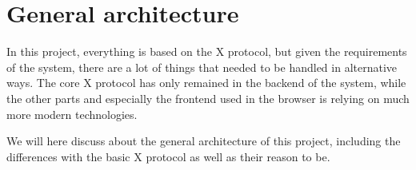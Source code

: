 \chapter{General architecture}
%
In this project, everything is based on the X protocol, but given the 
requirements of the system, there are a lot of things that needed to be 
handled in alternative ways. The core X protocol has only remained 
in the backend of the system, while the other parts and especially the 
frontend used in the browser is relying on much more modern technologies.

We will here discuss about the general architecture of this project, 
including the differences with the basic X protocol as well as their 
reason to be.
%

%

%

